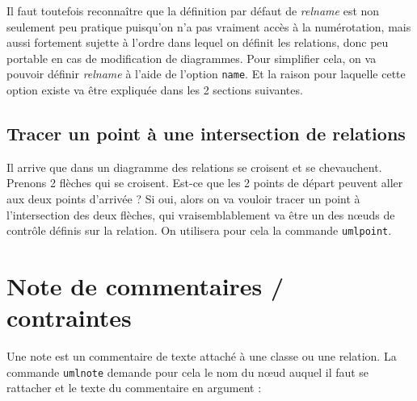 \documentclass[a4paper,11pt]{report}
\newcommand{\inputTikZ}[1]{%
  }%
\newcommand{\inputTikZ}[1]{%
    \texttt{[image: fig/\#1.pdf]}%
  }%
\begin{document}
Il faut toutefois reconnaître que la définition par défaut de {\it relname} est non seulement peu pratique puisqu'on n'a pas vraiment accès à la numérotation, mais aussi fortement sujette à l'ordre dans lequel on définit les relations, donc peu portable en cas de modification de diagrammes. Pour simplifier cela, on va pouvoir définir {\it relname} à l'aide de l'option {\tt name}. Et la raison pour laquelle cette option existe va être expliquée dans les 2 sections suivantes.

\subsection{Tracer un point à une intersection de relations}\label{ss.relpt}

Il arrive que dans un diagramme des relations se croisent et se chevauchent. Prenons 2 flèches qui se croisent. Est-ce que les 2 points de départ peuvent aller aux deux points d'arrivée ? Si oui, alors on va vouloir tracer un point à l'intersection des deux flèches, qui vraisemblablement va être un des n\oe{}uds de contrôle définis sur la relation. On utilisera pour cela la commande {\tt umlpoint}.

\medskip

\begin{minipage}{0.5\textwidth}

\end{minipage}
\begin{minipage}{0.4\textwidth}
\begin{center}
\inputTikZ{figure28}
\end{center}
\end{minipage}

\section{Note de commentaires / contraintes}\label{s.note}

Une note est un commentaire de texte attaché à une classe ou une relation. La commande {\tt umlnote} demande pour cela le nom du n\oe{}ud auquel il faut se rattacher et le texte du commentaire en argument :

\medskip

\begin{minipage}{0.5\textwidth}

\end{minipage}
\begin{minipage}{0.4\textwidth}
\begin{center}
\inputTikZ{figure29}
\end{center}
\end{minipage}
\end{document}
